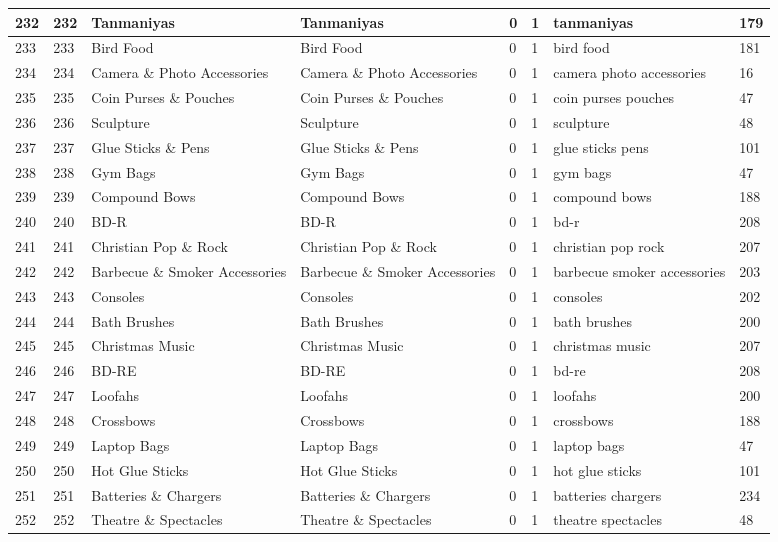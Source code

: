 \begin{longtable}{|l|l|l|l|l|l|l|l|}
232 & 232 & Tanmaniyas & Tanmaniyas & 0 & 1 & tanmaniyas & 179 \\ \hline 
233 & 233 & Bird Food & Bird Food & 0 & 1 & bird food & 181 \\ \hline 
234 & 234 & Camera \& Photo Accessories & Camera \& Photo Accessories & 0 & 1 & camera photo accessories & 16 \\ \hline 
235 & 235 & Coin Purses \& Pouches & Coin Purses \& Pouches & 0 & 1 & coin purses pouches & 47 \\ \hline 
236 & 236 & Sculpture & Sculpture & 0 & 1 & sculpture & 48 \\ \hline 
237 & 237 & Glue Sticks \& Pens & Glue Sticks \& Pens & 0 & 1 & glue sticks pens & 101 \\ \hline 
238 & 238 & Gym Bags & Gym Bags & 0 & 1 & gym bags & 47 \\ \hline 
239 & 239 & Compound Bows & Compound Bows & 0 & 1 & compound bows & 188 \\ \hline 
240 & 240 & BD-R & BD-R & 0 & 1 & bd-r & 208 \\ \hline 
241 & 241 & Christian Pop \& Rock & Christian Pop \& Rock & 0 & 1 & christian pop rock & 207 \\ \hline 
242 & 242 & Barbecue \& Smoker Accessories & Barbecue \& Smoker Accessories & 0 & 1 & barbecue smoker accessories & 203 \\ \hline 
243 & 243 & Consoles & Consoles & 0 & 1 & consoles & 202 \\ \hline 
244 & 244 & Bath Brushes & Bath Brushes & 0 & 1 & bath brushes & 200 \\ \hline 
245 & 245 & Christmas Music & Christmas Music & 0 & 1 & christmas music & 207 \\ \hline 
246 & 246 & BD-RE & BD-RE & 0 & 1 & bd-re & 208 \\ \hline 
247 & 247 & Loofahs & Loofahs & 0 & 1 & loofahs & 200 \\ \hline 
248 & 248 & Crossbows & Crossbows & 0 & 1 & crossbows & 188 \\ \hline 
249 & 249 & Laptop Bags & Laptop Bags & 0 & 1 & laptop bags & 47 \\ \hline 
250 & 250 & Hot Glue Sticks & Hot Glue Sticks & 0 & 1 & hot glue sticks & 101 \\ \hline 
251 & 251 & Batteries \& Chargers & Batteries \& Chargers & 0 & 1 & batteries chargers & 234 \\ \hline 
252 & 252 & Theatre \& Spectacles & Theatre \& Spectacles & 0 & 1 & theatre spectacles & 48 \\ \hline 

\end{longtable}
